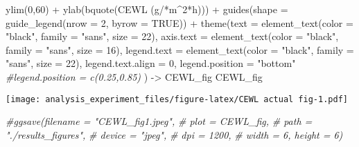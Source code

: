 \documentclass[
]{article}
\newenvironment{Shaded}{\begin{snugshade}}{\end{snugshade}}
\newcommand{\AttributeTok}[1]{\textcolor[rgb]{0.77,0.63,0.00}{#1}}
\newcommand{\CommentTok}[1]{\textcolor[rgb]{0.56,0.35,0.01}{\textit{#1}}}
\newcommand{\ConstantTok}[1]{\textcolor[rgb]{0.00,0.00,0.00}{#1}}
\newcommand{\DecValTok}[1]{\textcolor[rgb]{0.00,0.00,0.81}{#1}}
\newcommand{\FunctionTok}[1]{\textcolor[rgb]{0.00,0.00,0.00}{#1}}
\newcommand{\NormalTok}[1]{#1}
\newcommand{\OtherTok}[1]{\textcolor[rgb]{0.56,0.35,0.01}{#1}}
\newcommand{\SpecialCharTok}[1]{\textcolor[rgb]{0.00,0.00,0.00}{#1}}
\newcommand{\StringTok}[1]{\textcolor[rgb]{0.31,0.60,0.02}{#1}}
\begin{document}
\begin{Shaded}
\begin{Highlighting}[]
  \FunctionTok{ylim}\NormalTok{(}\DecValTok{0}\NormalTok{,}\DecValTok{60}\NormalTok{) }\SpecialCharTok{+}
  \FunctionTok{ylab}\NormalTok{(}\FunctionTok{bquote}\NormalTok{(}\StringTok{\textquotesingle{}CEWL (g/\textquotesingle{}}\SpecialCharTok{*}\NormalTok{m}\SpecialCharTok{\^{}}\DecValTok{2}\SpecialCharTok{*}\StringTok{\textquotesingle{}h)\textquotesingle{}}\NormalTok{)) }\SpecialCharTok{+} 
  \FunctionTok{guides}\NormalTok{(}\AttributeTok{shape =} \FunctionTok{guide\_legend}\NormalTok{(}\AttributeTok{nrow =} \DecValTok{2}\NormalTok{, }\AttributeTok{byrow =} \ConstantTok{TRUE}\NormalTok{)) }\SpecialCharTok{+}
  \FunctionTok{theme}\NormalTok{(}\AttributeTok{text =} \FunctionTok{element\_text}\NormalTok{(}\AttributeTok{color =} \StringTok{"black"}\NormalTok{, }
                            \AttributeTok{family =} \StringTok{"sans"}\NormalTok{, }
                            \AttributeTok{size =} \DecValTok{22}\NormalTok{),}
        \AttributeTok{axis.text =} \FunctionTok{element\_text}\NormalTok{(}\AttributeTok{color =} \StringTok{"black"}\NormalTok{, }
                                 \AttributeTok{family =} \StringTok{"sans"}\NormalTok{, }
                                 \AttributeTok{size =} \DecValTok{16}\NormalTok{),}
        \AttributeTok{legend.text =} \FunctionTok{element\_text}\NormalTok{(}\AttributeTok{color =} \StringTok{"black"}\NormalTok{, }
                                 \AttributeTok{family =} \StringTok{"sans"}\NormalTok{, }
                                 \AttributeTok{size =} \DecValTok{22}\NormalTok{),}
        \AttributeTok{legend.text.align =} \DecValTok{0}\NormalTok{,}
        \AttributeTok{legend.position =} \StringTok{"bottom"}
        \CommentTok{\#legend.position = c(0.25,0.85)}
\NormalTok{        ) }\OtherTok{{-}\textgreater{}}\NormalTok{ CEWL\_fig}
\NormalTok{CEWL\_fig}
\end{Highlighting}
\end{Shaded}

\texttt{[image: analysis\_experiment\_files/figure-latex/CEWL actual fig-1.pdf]}

\begin{Shaded}
\begin{Highlighting}[]
\CommentTok{\#ggsave(filename = "CEWL\_fig1.jpeg",}
 \CommentTok{\#      plot = CEWL\_fig,}
  \CommentTok{\#     path = "./results\_figures",}
   \CommentTok{\#    device = "jpeg",}
    \CommentTok{\#   dpi = 1200,}
     \CommentTok{\#  width = 6, height = 6)}
\end{Highlighting}
\end{Shaded}
\end{document}

